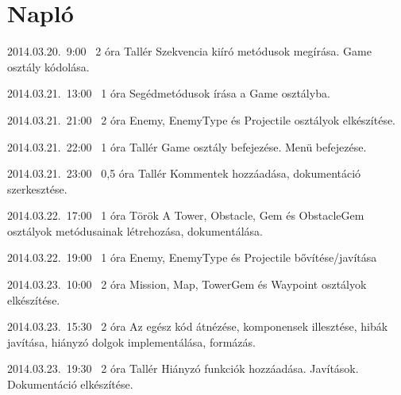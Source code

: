 %
\section{Napló}

\begin{naplo}

\bejegyzes
{2014.03.20.~9:00~} %
{2 óra} %
{Tallér} %
{Szekvencia kiíró metódusok megírása. Game osztály kódolása.}

\bejegyzes
{2014.03.21.~13:00~}
{1 óra}
{\vantal}
{Segédmetódusok írása a Game osztályba.}

\bejegyzes
{2014.03.21.~21:00~}
{2 óra}
{\vantal}
{Enemy, EnemyType és Projectile osztályok elkészítése.}

\bejegyzes
{2014.03.21.~22:00~} %
{1 óra} %
{Tallér} %
{Game osztály befejezése. Menü befejezése.}

\bejegyzes
{2014.03.21.~23:00~} %
{0,5 óra} %
{Tallér} %
{Kommentek hozzáadása, dokumentáció szerkesztése.}

\bejegyzes
{2014.03.22.~17:00~} %
{1 óra} %
{Török} %
{A Tower, Obstacle, Gem és ObstacleGem osztályok metódusainak létrehozása, dokumentálása.}

\bejegyzes
{2014.03.22.~19:00~}
{1 óra}
{\vantal}
{Enemy, EnemyType és Projectile bővítése/javítása}

\bejegyzes
{2014.03.23.~10:00~}
{2 óra}
{\vadam}
{Mission, Map, TowerGem és Waypoint osztályok elkészítése.}

\bejegyzes
{2014.03.23.~15:30~}
{2 óra}
{\vantal}
{Az egész kód átnézése, komponensek illesztése, hibák javítása, hiányzó dolgok implementálása, formázás.}

\bejegyzes
{2014.03.23.~19:30~}
{2 óra}
{Tallér}
{Hiányzó funkciók hozzáadása. Javítások. Dokumentáció elkészítése.}



\end{naplo}

